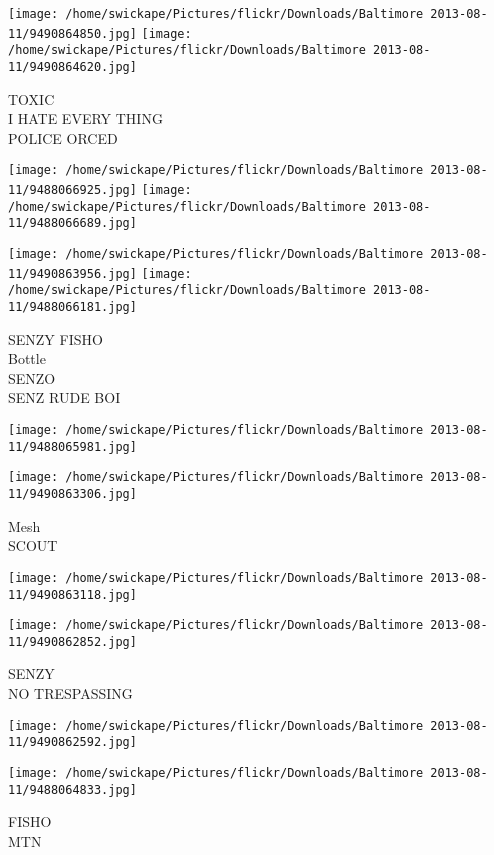 \documentclass[10pt,letterpaper]{article}
\begin{document}
\vspace{0.25in}
\texttt{[image: /home/swickape/Pictures/flickr/Downloads/Baltimore 2013-08-11/9490864850.jpg]}
\texttt{[image: /home/swickape/Pictures/flickr/Downloads/Baltimore 2013-08-11/9490864620.jpg]}

TOXIC\\
I HATE EVERY THING\\
POLICE ORCED
\pagebreak

\texttt{[image: /home/swickape/Pictures/flickr/Downloads/Baltimore 2013-08-11/9488066925.jpg]}
\texttt{[image: /home/swickape/Pictures/flickr/Downloads/Baltimore 2013-08-11/9488066689.jpg]}

\texttt{[image: /home/swickape/Pictures/flickr/Downloads/Baltimore 2013-08-11/9490863956.jpg]}
\texttt{[image: /home/swickape/Pictures/flickr/Downloads/Baltimore 2013-08-11/9488066181.jpg]}

SENZY FISHO\\
Bottle\\
SENZO\\
SENZ RUDE BOI
\pagebreak

\texttt{[image: /home/swickape/Pictures/flickr/Downloads/Baltimore 2013-08-11/9488065981.jpg]}

\vspace{0.25in}
\texttt{[image: /home/swickape/Pictures/flickr/Downloads/Baltimore 2013-08-11/9490863306.jpg]}

Mesh\\
SCOUT
\pagebreak

\texttt{[image: /home/swickape/Pictures/flickr/Downloads/Baltimore 2013-08-11/9490863118.jpg]}

\vspace{0.25in}
\texttt{[image: /home/swickape/Pictures/flickr/Downloads/Baltimore 2013-08-11/9490862852.jpg]}

SENZY\\
NO TRESPASSING
\pagebreak

\texttt{[image: /home/swickape/Pictures/flickr/Downloads/Baltimore 2013-08-11/9490862592.jpg]}

\vspace{0.25in}
\texttt{[image: /home/swickape/Pictures/flickr/Downloads/Baltimore 2013-08-11/9488064833.jpg]}

FISHO\\
MTN
\pagebreak
\end{document}
